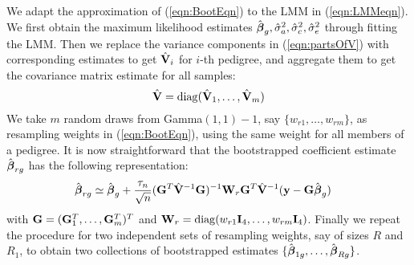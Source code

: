 We adapt the approximation of (\ref{eqn:BootEqn}) to the LMM in (\ref{eqn:LMMeqn}). We first obtain the maximum likelihood estimates $\hat {{\boldsymbol{\beta}}}_g, \hat \sigma_a^2, \hat \sigma_c^2, \hat \sigma_e^2$ through fitting the LMM. Then we replace the variance components in (\ref{eqn:partsOfV}) with corresponding estimates to get $\hat {{\mathbf{V}}}_i$ for $i$-th pedigree, and aggregate them to get the covariance matrix estimate for all samples:
%
$$
\hat {{\mathbf{V}}} = \operatorname*{diag} ( \hat {{\mathbf{V}}}_1, \ldots, \hat {{\mathbf{V}}}_m )
$$
%
We take $m$ random draws from Gamma$(1,1) - 1$, say $\{ w_{r1}, \ldots, w_{rm} \}$, as resampling weights in (\ref{eqn:BootEqn}), using the same weight for all members of a pedigree. It is now straightforward that the bootstrapped coefficient estimate $\hat {{\boldsymbol{\beta}}}_{r g}$ has the following representation:
%
\begin{align}
\hat {{\boldsymbol{\beta}}}_{r g} & \simeq \hat {{\boldsymbol{\beta}}}_g + \frac{ \tau_n}{\sqrt n} ( {\mathbf{G}}^T \hat {{\mathbf{V}}}^{-1} {\mathbf{G}} )^{-1}
{\mathbf{W}}_r {\mathbf{G}}^T \hat {{\mathbf{V}}}^{-1} ( {\bf{y}} - {\mathbf{G}} \hat {{\boldsymbol{\beta}}}_g)
\end{align}
%
with ${\mathbf{G}} = ( {\mathbf{G}}_1^T, \ldots, {\mathbf{G}}_m^T )^T$ and ${\mathbf{W}}_r = \operatorname*{diag} (w_{r1} {\mathbf{I}}_4, \ldots, w_{r m} {\mathbf{I}}_4 )$. Finally we repeat the procedure for two independent sets of resampling weights, say of sizes $R$ and $R_1$, to obtain two collections of bootstrapped estimates $\{ \hat {{\boldsymbol{\beta}}}_{1g}, \ldots, \hat {{\boldsymbol{\beta}}}_{Rg} \}$.



